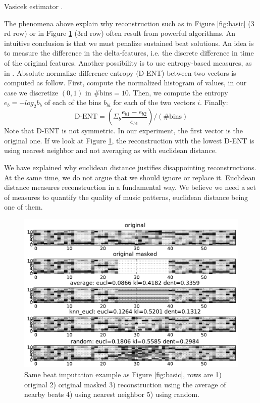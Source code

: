 \documentclass{article}
\begin{document}
Vasicek estimator \cite{Learned-Miller2003}.

The phenomena above explain why reconstruction such as
in Figure \ref{fig:basic} ($3$rd row) or in Figure \ref{fig:avgnnrand}
($3$rd row) often result from powerful algorithms. An intuitive
conclusion is that we must penalize sustained beat solutions.
An idea is to measure the difference in the delta-features, i.e.
the discrete difference in time of the original features.
Another possibility is to use entropy-based measures, as in
\cite{Mentzelopoulos2004}.
Absolute normalize difference entropy (D-ENT)
between two vectors is computed as follow. First, compute the normalized histogram 
of values, in our case we discretize $(0,1)$ in $\mbox{\# bins} = 10$. 
Then, we compute the entropy
$e_b = - log_2 b_b$ of each of the bins $b_{bi}$ for each of the two vectors $i$. Finally:
\[
\mbox{D-ENT} = \left( \Sigma_b \frac{e_{b1} - e_{b2}}{e_{b1}} \right) / (\mbox{\# bins})
\]
Note that D-ENT is not symmetric. In our experiment, the first vector is the original one.
If we look at Figure \ref{fig:avgnnrand}, the reconstruction with the lowest D-ENT is using
nearest neighbor and not averaging as with euclidean distance.

We have explained why euclidean distance justifies disappointing reconstructions. At the same
time, we do not argue that we should ignore or replace it. Euclidean distance measures
reconstruction in a fundamental way. We believe we need a set of measures to quantify the
quality of music patterns, euclidean distance being one of them.

\begin{figure}[t]
\begin{center}
\includegraphics[width=.95\columnwidth]{avg_nn_rand}
\end{center}
\caption{Same beat imputation example as Figure \ref{fig:basic}, 
rows are 1) original 2) original masked
3) reconstruction using the average of nearby beats 4) using
nearest neighbor 5) using random.
\label{fig:avgnnrand}}
\end{figure}
\end{document}
